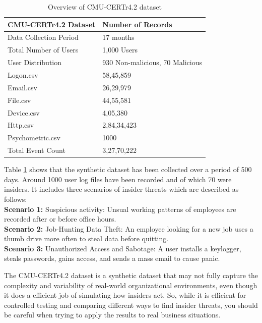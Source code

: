 \begin{table}[!ht]
\centering
\caption{Overview of CMU-CERTr4.2 dataset}\label{tab5}%
\begin{tabular}{@{}ll@{}}
\toprule
    \textbf{CMU-CERTr4.2 Dataset} & \textbf{Number of Records}  \\
\midrule
Data Collection Period	& 17 months\\
Total Number of Users	& 1,000 Users\\
User Distribution	& 930 Non-malicious, 70 Malicious\\
Logon.csv	& 58,45,859\\
Email.csv	& 26,29,979\\
File.csv	& 44,55,581\\
Device.csv	& 4,05,380\\
Http.csv	& 2,84,34,423\\
Psychometric.csv & 1000 \\
Total Event Count	& 3,27,70,222\\
\bottomrule
\end{tabular}
\end{table}

Table \ref{tab5} shows that the synthetic dataset has been collected over a period of 500 days. Around 1000 user log files have been recorded and of which 70 were insiders. It includes three scenarios of insider threats which are described as follows: \\
\textbf{Scenario 1:}  Suspicious activity: Unsual working patterns of employees are recorded after or before office hours.\\
\textbf{Scenario 2:}  Job-Hunting Data Theft: An employee looking for a new job uses a thumb drive more often to steal data before quitting.\\ \textbf{Scenario 3:} Unauthorized Access and Sabotage: A user installs a keylogger, steals passwords, gains access, and sends a mass email to cause panic.

 The CMU-CERTr4.2 dataset is a synthetic dataset that may not fully capture the complexity and variability of real-world organizational environments, even though it does a efficient job of simulating how insiders act.  So, while it is efficient for controlled testing and comparing different ways to find insider threats, you should be careful when trying to apply the results to real business situations.
 
